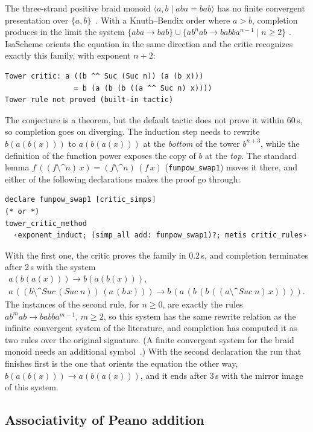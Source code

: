 \documentclass[preprint,12pt]{elsarticle}
\newcommand{\rw}{\to}
\newcommand{\pp}{\mathbin{\texttt{\^{}\^{}}}}     %
\newcommand{\fp}[2]{(#1 \pp #2)}                  %
\newcommand{\isa}[1]{\texttt{#1}}
\newcommand{\Suc}{\mathit{Suc}}
\begin{document}
The three-strand positive braid monoid $\langle a, b \mid aba = bab\rangle$
has no finite convergent presentation over $\{a, b\}$~\cite{KapurNarendran85}.
With a Knuth--Bendix order where $a > b$, completion produces in the limit
the system $\{aba \rw bab\} \cup \{ab^nab \rw babba^{n-1} \mid n \ge 2\}$
\cite[Example~1]{HirokawaMiddeldorpSternagelWinkler17}. IsaScheme orients
the equation in the same direction and the critic recognizes exactly this
family, with exponent $n + 2$:
\begin{lstlisting}[language={}]
Tower critic: a ((b ^^ Suc (Suc n)) (a (b x)))
                = b (a (b (b ((a ^^ Suc n) x))))
Tower rule not proved (built-in tactic)
\end{lstlisting}
The conjecture is a theorem, but the default tactic does not prove it
within 60\,s, so completion goes on diverging. The induction step needs
to rewrite $b(a(b(x)))$ to $a(b(a(x)))$ at the \emph{bottom} of the tower
$b^{n+3}$, while the definition of the function power exposes the copy of
$b$ at the \emph{top}. The standard lemma
$f\,(\fp{f}{n}\,x) = \fp{f}{n}\,(f\,x)$ (\isa{funpow\_swap1}) moves it
there, and either of the following declarations makes the proof go
through:
\begin{lstlisting}
declare funpow_swap1 [critic_simps]
(* or *)
tower_critic_method
  ‹exponent_induct; (simp_all add: funpow_swap1)?; metis critic_rules›
\end{lstlisting}
With the first one, the critic proves the family in 0.2\,s, and completion
terminates after 2\,s with the system
\begin{gather*}
  a(b(a(x))) \rw b(a(b(x))), \\
  a\,(\fp{b}{\Suc\,(\Suc\;n)}\,(a\,(b\,x))) \rw
  b\,(a\,(b\,(b\,(\fp{a}{\Suc\;n}\,x)))).
\end{gather*}
The instances of the second rule, for $n \ge 0$, are exactly the rules
$ab^mab \rw babba^{m-1}$, $m \ge 2$, so this system has the same rewrite
relation as the infinite convergent system of the literature, and
completion has computed it as two rules over the original signature. (A finite
convergent system for the braid monoid needs an additional
symbol~\cite{Burckel01}.) With the second declaration the run that
finishes first is the one that orients the equation the other way,
$b(a(b(x))) \rw a(b(a(x)))$, and it ends after 3\,s with the mirror image
of this system.

\subsection{Associativity of Peano addition}
\end{document}
